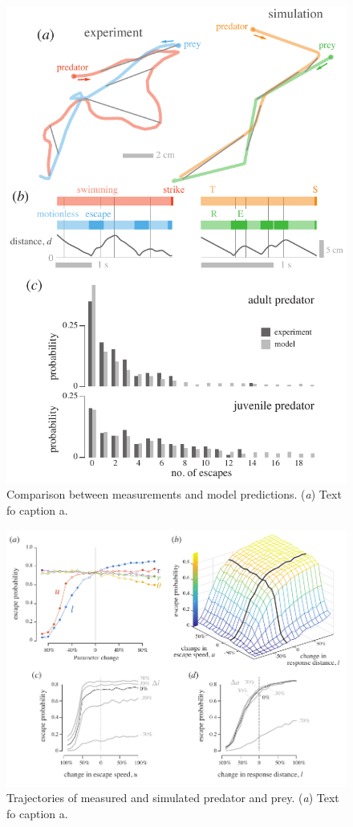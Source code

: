 \documentclass[]{rsos}%
\begin{document}
\pagebreak

\pagebreak

\begin{figure}[!h]
\centering
	\includegraphics[width=5.5in]{fig_trajectories}
\caption{Comparison between measurements and model predictions. 
(\textit{a}) Text fo caption a.}
\label{fig_traj}
\end{figure}

\begin{figure}[!h]
\centering
	\includegraphics[width=5.5in]{fig_sensitivity}
\caption{Trajectories of measured and simulated predator and prey. 
(\textit{a}) Text fo caption a.}
\label{fig_sense}
\end{figure}

\pagebreak
\end{document}

